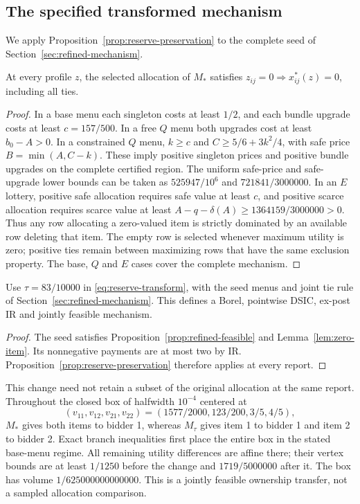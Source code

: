 \subsection{The specified transformed mechanism}\label{sec:v5-primal}
We apply Proposition~\ref{prop:reserve-preservation} to the complete seed
of Section~\ref{sec:refined-mechanism}.
\begin{lemma}\label{lem:zero-item}
At every profile $z$, the selected allocation of $M_*$ satisfies
$z_{ij}=0\Rightarrow x^*_{ij}(z)=0$, including all ties.
\end{lemma}
\begin{proof}
In a base menu each singleton costs at least $1/2$, and each bundle
upgrade costs at least $c=157/500$. In a free $Q$ menu both upgrades
cost at least $b_0-A>0$. In a constrained $Q$ menu, $k\ge c$ and
$C\ge5/6+3k^2/4$, with safe price $B=\min(A,C-k)$.
These imply positive singleton prices and positive bundle upgrades on
the complete certified region. The uniform safe-price and safe-upgrade
lower bounds can be taken as $525947/10^6$ and $721841/3000000$.
In an $E$ lottery, positive safe allocation requires safe value at least
$c$, and positive scarce allocation requires scarce value at least
$A-q-\delta(A)\ge1364159/3000000>0$.
Thus any row allocating a zero-valued item is strictly dominated by an
available row deleting that item. The empty row is selected whenever
maximum utility is zero; positive ties remain between maximizing rows
that have the same exclusion property. The base, $Q$ and $E$ cases cover
the complete mechanism.
\end{proof}


\begin{proposition}\label{prop:v5-feasible}
Use $\tau=83/10000$ in \eqref{eq:reserve-transform}, with the seed menus
and joint tie rule of Section~\ref{sec:refined-mechanism}. This defines
a Borel, pointwise DSIC, ex-post IR and jointly feasible mechanism.
\end{proposition}
\begin{proof}
The seed satisfies Proposition~\ref{prop:refined-feasible} and
Lemma~\ref{lem:zero-item}. Its nonnegative payments are at most two by IR.
Proposition~\ref{prop:reserve-preservation} therefore applies at every report.
\end{proof}

This change need not retain a subset of the original allocation at the
same report. Throughout the closed box of halfwidth $10^{-4}$ centered at
\[
 (v_{11},v_{12},v_{21},v_{22})=(1577/2000,123/200,3/5,4/5),
\]
$M_*$ gives both items to bidder 1, whereas $M_\tau$ gives item 1 to
bidder 1 and item 2 to bidder 2. Exact branch inequalities first place
the entire box in the stated base-menu regime. All remaining utility
differences are affine there; their vertex bounds are at least $1/1250$
before the change and $1719/5000000$ after it. The box has volume
$1/625000000000000$. This is a jointly feasible ownership transfer,
not a sampled allocation comparison.

